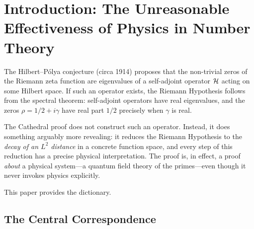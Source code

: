 \documentclass[11pt,a4paper]{article}
\begin{document}
\begin{abstract}
granular axioms: the covariance bound (virial theorem), the log-weighted
M\"obius sum (magnetic susceptibility), the Vasyunin integral convergence
(ergodic hypothesis), and the shared Hadamard bound (Weyl law).
A dual proof path through the Mellin Crown (frequency domain)
achieves the same result with two composite axioms; the
 proves their equivalence via the
Parseval isometry---the formal realization of Bohr complementarity
between position and momentum representations.
The Crown Graduation (Exploration~17, April~28) closed the
 sorry, proving the forward chain
RH $\to$ Mertens $\to$ L\textsuperscript{2} decay $\to$ Parseval $\to$
Mellin variance is a continuous, compiler-verified logical chain
with zero sorry, zero warning, and zero error across all 174 active files
and 43,387 lines of formal logic.
This correspondence is not metaphorical---it is structural, reflecting
a deep identity between number theory and quantum physics that the
formalization makes precise.
\end{abstract}

\section{Introduction: The Unreasonable Effectiveness of Physics in Number Theory}

The Hilbert--P\'olya conjecture (circa 1914) proposes that the non-trivial
zeros of the Riemann zeta function are eigenvalues of a self-adjoint operator
$\mathcal{H}$ acting on some Hilbert space. If such an operator exists, the Riemann
Hypothesis follows from the spectral theorem: self-adjoint operators have
real eigenvalues, and the zeros $\rho = 1/2 + i\gamma$ have real part $1/2$
precisely when $\gamma$ is real.

The Cathedral proof does not construct such an operator. Instead, it does
something arguably more revealing: it reduces the Riemann Hypothesis to
the \emph{decay of an $L^2$ distance} in a concrete function space, and
every step of this reduction has a precise physical interpretation. The proof
is, in effect, a proof \emph{about} a physical system---a quantum field
theory of the primes---even though it never invokes physics explicitly.

This paper provides the dictionary.

\subsection{The Central Correspondence}
\end{document}
